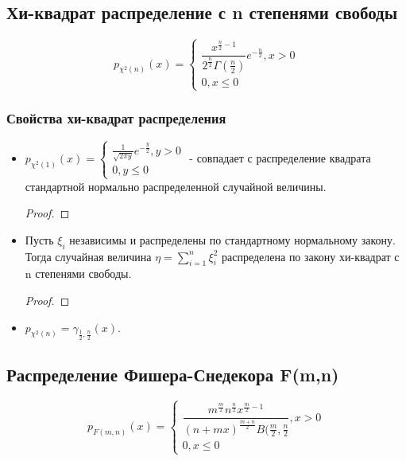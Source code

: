 \subsection{Хи-квадрат распределение с n степенями свободы}

\begin{definition}
  \[
    p_{\chi^2(n)} (x) = \begin{cases}
       \dfrac{x^{\frac{n}{2} - 1}}{2^\frac{n}{2} \Gamma(\frac{n}{2})} e^{-\frac{n}{2}}, x>0 \\
       0, x\leqslant 0
    \end{cases}
  \]
\end{definition}

\subsubsection{Свойства хи-квадрат распределения}

\begin{itemize}
  \item $p_{\chi^2(1)} (x) = \begin{cases}
      \frac{1}{\sqrt{2\pi y}} e^{-\frac{y}{2}}, y>0 \\
      0, y\leqslant 0
    \end{cases}$ - совпадает с распределение квадрата стандартной нормально распределенной случайной величины.
    
    \begin{proof}
    
    \end{proof}

  \item Пусть $\xi_i$ независимы и распределены по стандартному нормальному закону. Тогда случайная величина $\eta = \sum_{i=1}^n \xi_i^2$ распределена по закону хи-квадрат с n степенями свободы.
  
    \begin{proof}
    \end{proof}

  \item $p_{\chi^2(n)} = \gamma_{\frac{1}{2}, \frac{n}{2}} (x)$.
\end{itemize}

\subsection{Распределение Фишера-Снедекора F(m,n)}

\begin{definition}
  \[
    p_{F(m, n)} (x) = \begin{cases}
      \dfrac{m^\frac{m}{2} n^\frac{n}{2} x^{\frac{m}{2}-1}}{(n+mx)^\frac{m+n}{2} B(\frac{m}{2}, \frac{n}{2}}, x>0 \\
      0, x\leqslant 0
    \end{cases}
  \]
\end{definition}

